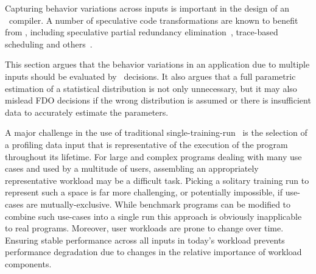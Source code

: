 

Capturing behavior variations across inputs is important in the design
of an \FDO\ compiler. A number of speculative code transformations are
known to benefit from \FDO, including speculative partial redundancy
elimination~\cite{ChowChanPLDI97,GuptaICCL98}, trace-based
scheduling and others~\cite{BodikGuptaPLDI97,ChekuriMICRO96}.%

This section argues that the behavior
variations in an application due to multiple inputs should be
evaluated by \FDO\ decisions.  It also argues that a full parametric
estimation of a statistical distribution is not only unnecessary, but
it may also mislead FDO decisions if the wrong distribution is assumed
or there is insufficient data to accurately estimate the
parameters.%


A major challenge in the use of traditional single-training-run \FDO\
is the selection of a profiling data input that is representative of
the execution of the program throughout its lifetime.  For large and
complex programs dealing with many use cases and used by a multitude
of users, assembling an appropriately representative workload may be a
difficult task.  Picking a solitary training run to represent such a
space is far more challenging, or potentially impossible, if use-cases
are mutually-exclusive.  While benchmark programs can be modified to
combine such use-cases into a single run %
this approach is obviously inapplicable to real programs.  Moreover,
user workloads are prone to change over time.  Ensuring stable
performance across all inputs in today's workload prevents performance
degradation due to changes in the relative importance of workload
components.

